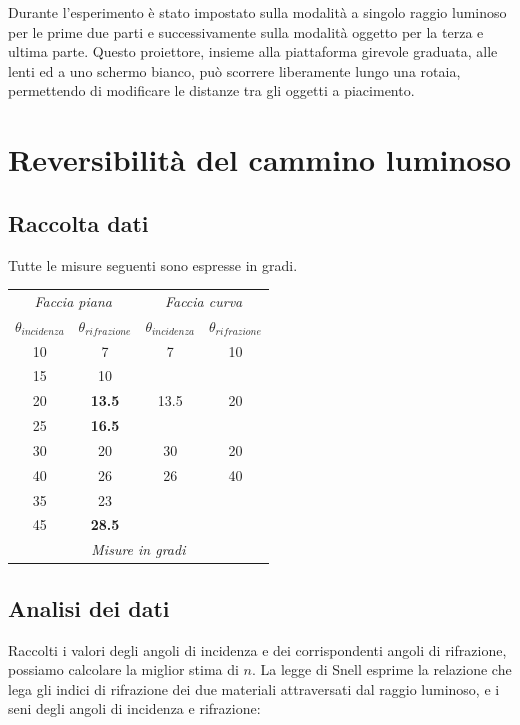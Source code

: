 \documentclass[a4paper,10pt]{report}
\begin{document}
Durante l'esperimento è stato impostato sulla modalità a singolo raggio luminoso per le prime due parti e successivamente sulla modalità oggetto per la terza e ultima parte. 
Questo proiettore, insieme alla piattaforma girevole graduata, alle lenti ed a uno schermo bianco, può scorrere liberamente lungo una rotaia, permettendo di modificare le distanze tra gli oggetti a piacimento.

\section{Reversibilità del cammino luminoso}
\subsection{Raccolta dati}
Tutte le misure seguenti sono espresse in gradi.\\
\begin{center}

\begin{tabular}{c|c||c|c}
 \multicolumn{2}{c}{\textit{Faccia piana}} &
\multicolumn{2}{c}{\textit{Faccia curva}} \\
$\theta_{incidenza} $ & $\theta_{rifrazione} $ &$\theta_{incidenza} $ & $\theta_{rifrazione} $\\
\midrule
 10 & 7 & 7 & 10 \\
15 & 10 & &\\
20 & \textbf{13.5} & 13.5 & 20\\ 
25 & \textbf{16.5} & & \\
30 & 20 & 30 & 20\\
40 & 26 & 26 & 40\\
35 & 23 & &\\
45&  \textbf{28.5} & & \\
\multicolumn{4}{c}{\textit{Misure in gradi}} \\
\end{tabular}
\end{center}

\subsection{Analisi dei dati}
Raccolti i valori degli angoli di incidenza e dei corrispondenti angoli di rifrazione, possiamo calcolare la miglior stima di $n$. 
La legge di Snell esprime la relazione che lega gli indici di rifrazione dei due materiali attraversati dal raggio luminoso, e i seni degli angoli di incidenza e rifrazione:\\
\end{document}
